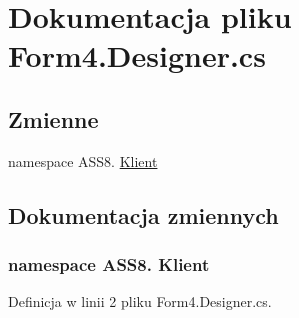 \hypertarget{a00048}{
\section{Dokumentacja pliku Form4.Designer.cs}
\label{d4/dca/a00048}
}
\subsection*{Zmienne}
\begin{CompactItemize}
\item 
﻿namespace ASS8. \hyperlink{a00048_50d8d80fabd02a9a24fb725624e1ad24}{Klient}
\end{CompactItemize}


\subsection{Dokumentacja zmiennych}
\hypertarget{a00048_50d8d80fabd02a9a24fb725624e1ad24}{
\subsubsection[{Klient}]{\setlength{\rightskip}{0pt plus 5cm}﻿namespace ASS8. Klient}}
\label{d4/dca/a00048_50d8d80fabd02a9a24fb725624e1ad24}




Definicja w linii 2 pliku Form4.Designer.cs.